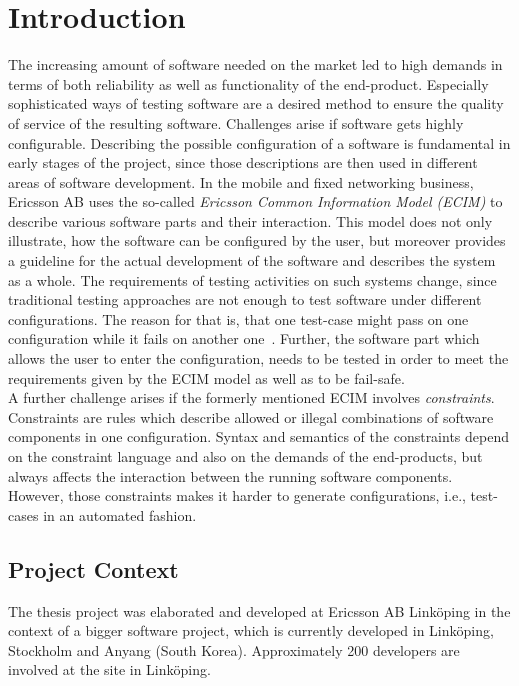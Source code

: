 \chapter{Introduction}\label{chap:introduction}

The increasing amount of software needed on the market led to high demands in terms of both reliability as well as functionality of the end-product.
Especially sophisticated ways of testing software are a desired method to ensure the quality of service of the resulting software. Challenges arise if software gets highly configurable. Describing the possible configuration of a software is fundamental in early stages of the project, since those descriptions are then used in different areas of software development. In the mobile and fixed networking business, Ericsson AB uses the so-called \emph{Ericsson Common Information Model (ECIM)} to describe various software parts and their interaction. This model does not only illustrate, how the software can be configured by the user, but moreover provides a guideline for the actual development of the software and describes the system as a whole.
The requirements of testing activities on such systems change, since traditional testing approaches are not enough to test software under different configurations. The reason for that is, that one test-case might pass on one configuration while it fails on another one~\cite{interaction-test-hcs-constr}. Further, the software part which allows the user to enter the configuration, needs to be tested in order to meet the requirements given by the ECIM model as well as to be fail-safe.\\

A further challenge arises if the formerly mentioned ECIM involves \emph{constraints}. Constraints are rules which describe allowed or illegal combinations of software components in one configuration. Syntax and semantics of the constraints depend on the constraint language and also on the demands of the end-products, but always affects the interaction between the running software components. However, those constraints makes it harder to generate configurations, i.e., test-cases in an automated fashion.

\section{Project Context}\label{sec:project-context}

The thesis project was elaborated and developed at Ericsson AB Linköping in the context of a bigger software project, which is currently developed in Linköping, Stockholm and Anyang (South Korea). Approximately 200 developers are involved at the site in Linköping. \\


